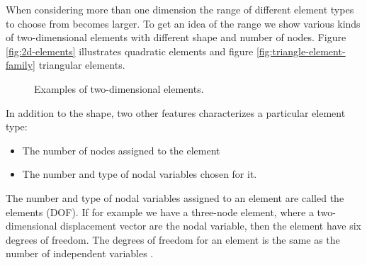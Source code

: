 When considering more than one dimension the range of different
element types to choose from becomes larger.
To get an idea of the range we show various kinds of
two-dimensional elements with different shape and number of
nodes. Figure \vref{fig:2d-elements}
illustrates quadratic elements and figure
\vref{fig:triangle-element-family} triangular elements.

\begin{figure}
  \centering
  \hspace{10mm}
  \caption{Examples of two-dimensional elements.}
  \label{fig:2d-elements}
\end{figure}

In addition to the shape, two other features characterizes a
particular element type:

\begin{itemize}
\item The number of nodes assigned to the element
\item The number and type of nodal variables chosen for it.
\end{itemize}

The number and type of nodal variables assigned to an element are
called the elements  (DOF). If for example we have a
three-node element, where a two-dimensional displacement vector are
the nodal variable, then the element have six degrees of freedom. The
degrees of freedom for an element is the same as the number of
independent variables .

